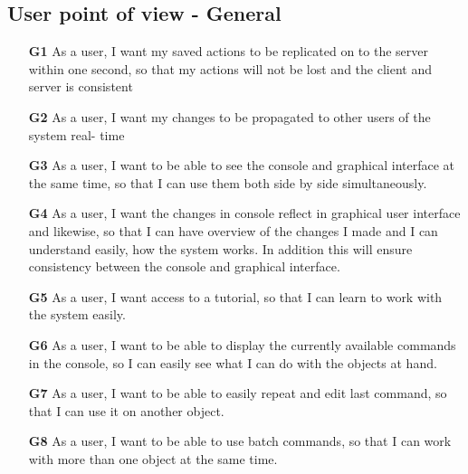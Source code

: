 \subsection*{User point of view - General}
\begin{itemize}
  \item [\textbf{G1}] As a user, I want my saved actions to be replicated on to the server within one second, so that my actions will not be lost and the client and server is consistent
  \item [\textbf{G2}] As a user, I want my changes to be propagated to other users of the system real- time
  \item [\textbf{G3}] As a user, I want to be able to see the console and graphical interface at the same time, so that I can use them both side by side simultaneously.
  \item [\textbf{G4}] As a user, I want the changes in console reflect in graphical user interface and likewise, so that I can have overview of the changes I made and I can understand easily, how the system works. In addition this will ensure consistency between the console and graphical interface.
  \item [\textbf{G5}] As a user, I want access to a tutorial, so that I can learn to work with the system easily.
  \item [\textbf{G6}] As a user, I want to be able to display the currently available commands in the console, so I can easily see what I can do with the objects at hand.
  \item [\textbf{G7}] As a user, I want to be able to easily repeat and edit last command, so that I can use it on another object.
  \item [\textbf{G8}] As a user, I want to be able to use batch commands, so that I can work with more than one object at the same time.
\end{itemize}

